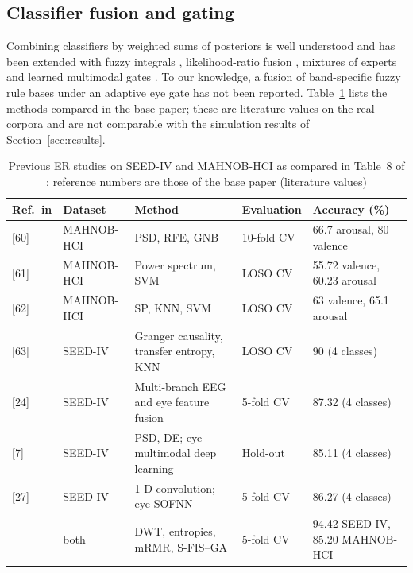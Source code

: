 \documentclass[10pt,twoside]{article}
\begin{document}
\subsection{Classifier fusion and gating}
Combining classifiers by weighted sums of posteriors is well understood \cite{Kittler1998} and has been extended with fuzzy integrals \cite{ChoKim1995}, likelihood-ratio fusion \cite{Nandakumar2008}, mixtures of experts \cite{Jacobs1991} and learned multimodal gates \cite{Arevalo2020}. To our knowledge, a fusion of band-specific fuzzy rule bases under an adaptive eye gate has not been reported. Table~\ref{tab:lit} lists the methods compared in the base paper; these are literature values on the real corpora and are not comparable with the simulation results of Section~\ref{sec:results}.

\begin{table}[t]
\caption{Previous ER studies on SEED-IV and MAHNOB-HCI as compared in Table~8 of \cite{FarhadiSedehi2024a}; reference numbers are those of the base paper (literature values)}
\label{tab:lit}
\scriptsize
\setlength{\tabcolsep}{3pt}
\begin{tabularx}{\linewidth}{@{}l l X l X@{}}
\toprule
Ref.\ in \cite{FarhadiSedehi2024a} & Dataset & Method & Evaluation & Accuracy (\%) \\
\midrule
{[60]} & MAHNOB-HCI & PSD, RFE, GNB & 10-fold CV & 66.7 arousal, 80 valence \\
{[61]} & MAHNOB-HCI & Power spectrum, SVM & LOSO CV & 55.72 valence, 60.23 arousal \\
{[62]} & MAHNOB-HCI & SP, KNN, SVM & LOSO CV & 63 valence, 65.1 arousal \\
{[63]} & SEED-IV & Granger causality, transfer entropy, KNN & LOSO CV & 90 (4 classes) \\
{[24]} & SEED-IV & Multi-branch EEG and eye feature fusion & 5-fold CV & 87.32 (4 classes) \\
{[7]} & SEED-IV & PSD, DE; eye + multimodal deep learning & Hold-out & 85.11 (4 classes) \\
{[27]} & SEED-IV & 1-D convolution; eye SOFNN & 5-fold CV & 86.27 (4 classes) \\
\cite{FarhadiSedehi2024a} & both & DWT, entropies, mRMR, S-FIS--GA & 5-fold CV & 94.42 SEED-IV, 85.20 MAHNOB-HCI \\
\bottomrule
\end{tabularx}
\end{table}
\end{document}
